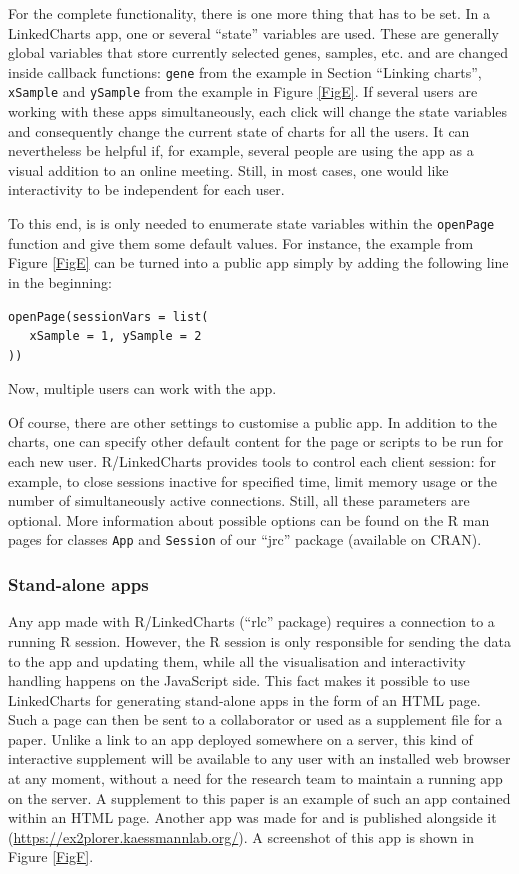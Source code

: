 \documentclass[twocolumn,10pt]{article}
\begin{document}
For the complete functionality, there is one more thing that has to be set. In a LinkedCharts app, one or several ``state'' variables are used. These are generally global variables that store currently selected genes, samples, etc. and are changed inside callback functions: \texttt{gene} from the example in Section ``Linking charts'', \texttt{xSample} and \texttt{ySample} from the example in Figure \ref{FigE}. If several users are working with these apps simultaneously, each click will change the state variables and consequently change the current state of charts for all the users. It can nevertheless be helpful if, for example, several people are using the app as a visual addition to an online meeting. Still, in most cases, one would like interactivity to be independent for each user.

To this end, is is only needed to enumerate state variables within the \texttt{openPage} function and give them some default values. For instance, the example from Figure \ref{FigE} can be turned into a public app simply by adding the following line in the beginning:

\begin{verbatim}
openPage(sessionVars = list(
   xSample = 1, ySample = 2
))
\end{verbatim}

Now, multiple users can work with the app.

Of course, there are other settings to customise a public app. In addition to the charts, one can specify other default content for the page or scripts to be run for each new user. R/LinkedCharts provides tools to control each client session: for example, to close sessions inactive for specified time, limit memory usage or the number of simultaneously active connections. Still, all these parameters are optional. More information about possible options can be found on the R man pages for classes \texttt{App} and \texttt{Session} of our ``jrc'' package (available on CRAN).

\subsubsection{Stand-alone apps}

Any app made with R/LinkedCharts (``rlc'' package) requires a connection to a running R session. However, the R session is only responsible for sending the data to the app and updating them, while all the visualisation and interactivity handling happens on the JavaScript side. This fact makes it possible to use LinkedCharts for generating stand-alone apps in the form of an HTML page. Such a page can then be sent to a collaborator or used as a supplement file for a paper. Unlike a link to an app deployed somewhere on a server, this kind of interactive supplement will be available to any user with an installed web browser at any moment, without a need for the research team to maintain a running app on the server. A supplement to this paper is an example of such an app contained within an HTML page. Another app was made for \citet{wang_2020} and is published alongside it (\url{https://ex2plorer.kaessmannlab.org/}). A screenshot of this app is shown in Figure \ref{FigF}.
\end{document}
